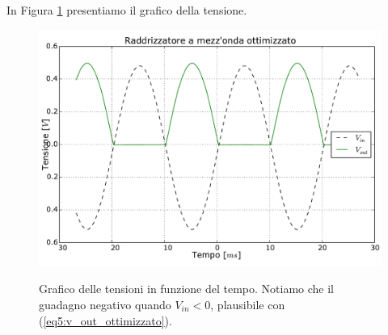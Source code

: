 In Figura \ref{gr5:secondo_raddrizzatore} presentiamo il grafico della tensione.

\begin{figure}[ht]
 \centering
   {\includegraphics[width=14.5cm]{../E05/latex/radd_ott.pdf}}
 \caption{Grafico delle tensioni in funzione del tempo. Notiamo che il guadagno negativo quando $V_{in}<0$, plausibile con (\ref{eq5:v_out_ottimizzato}).}
 \label{gr5:secondo_raddrizzatore}
\end{figure}